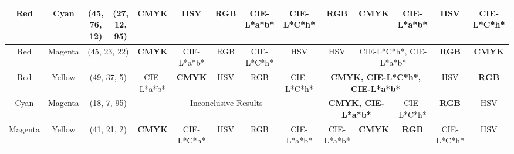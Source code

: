 \begin{table}[htbp]
{\begin{tabular}{@{}cccccccccccccc@{}}
    Red     & \multicolumn{1}{c|}{Cyan}    & \multicolumn{1}{c|}{\cellcolor[HTML]{80FF00}(45, 76, 12)} & \multicolumn{1}{c|}{\cellcolor[HTML]{7F00FF}(27, 12, 95)} & \multicolumn{1}{c|}{\textbf{CMYK}} & \multicolumn{1}{c|}{HSV}           & \multicolumn{1}{c|}{RGB}        & \multicolumn{1}{c|}{CIE-L*a*b*} & \multicolumn{1}{c|}{CIE-L*C*h*} & \multicolumn{1}{c|}{\textbf{RGB}}  & \multicolumn{1}{c|}{\textbf{CMYK}} & \multicolumn{1}{c|}{CIE-L*a*b*}    & \multicolumn{1}{c|}{HSV}           & \multicolumn{1}{c|}{CIE-L*C*h*}    \\ \midrule
    Red     & \multicolumn{1}{c|}{Magenta} & \multicolumn{2}{c|}{\cellcolor[HTML]{FF0080}(45, 23, 22)}                                                             & \multicolumn{1}{c|}{\textbf{CMYK}} & \multicolumn{1}{c|}{CIE-L*a*b*}    & \multicolumn{1}{c|}{RGB}        & \multicolumn{1}{c|}{CIE-L*C*h*} & \multicolumn{1}{c|}{HSV}        & \multicolumn{1}{c|}{HSV}           & \multicolumn{2}{c|}{CIE-L*C*h*, CIE-L*a*b*}                             & \multicolumn{1}{c|}{\textbf{RGB}}  & \multicolumn{1}{c|}{\textbf{CMYK}} \\ \midrule
    Red     & \multicolumn{1}{c|}{Yellow}  & \multicolumn{2}{c|}{\cellcolor[HTML]{FF8000}(49, 37, 5)}                                                              & \multicolumn{1}{c|}{CIE-L*a*b*}    & \multicolumn{1}{c|}{\textbf{CMYK}} & \multicolumn{1}{c|}{HSV}        & \multicolumn{1}{c|}{RGB}        & \multicolumn{1}{c|}{CIE-L*C*h*} & \multicolumn{3}{c|}{\textbf{CMYK, CIE-L*C*h*, CIE-L*a*b*}}                                                   & \multicolumn{1}{c|}{HSV}           & \multicolumn{1}{c|}{\textbf{RGB}}  \\ \midrule
    Cyan    & \multicolumn{1}{c|}{Magenta} & \multicolumn{2}{c|}{\cellcolor[HTML]{0000FF}(18, 7, 95)}                                                              & \multicolumn{5}{c|}{Inconclusive Results}                                                                                                                                     & \multicolumn{2}{c|}{\textbf{CMYK, CIE-L*a*b*}}                          & \multicolumn{1}{c|}{CIE-L*C*h*}    & \multicolumn{1}{c|}{\textbf{RGB}}  & \multicolumn{1}{c|}{HSV}           \\ \midrule
    Magenta & \multicolumn{1}{c|}{Yellow}  & \multicolumn{2}{c|}{\cellcolor[HTML]{FF0000}(41, 21, 2)}                                                              & \multicolumn{1}{c|}{\textbf{CMYK}} & \multicolumn{1}{c|}{CIE-L*C*h*}    & \multicolumn{1}{c|}{HSV}        & \multicolumn{1}{c|}{RGB}        & \multicolumn{1}{c|}{CIE-L*a*b*} & \multicolumn{1}{c|}{CIE-L*a*b*}    & \multicolumn{1}{c|}{\textbf{CMYK}} & \multicolumn{1}{c|}{\textbf{RGB}}  & \multicolumn{1}{c|}{CIE-L*C*h*}    & \multicolumn{1}{c|}{HSV}           \\ \midrule

\end{tabular}}
\end{table}
